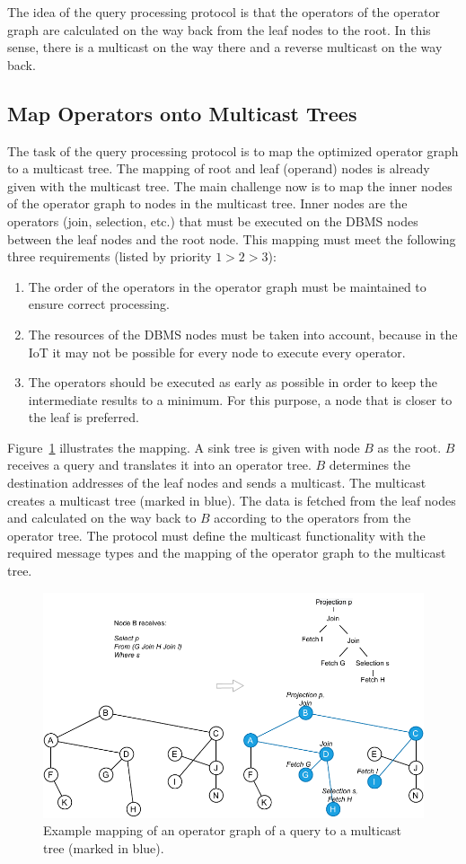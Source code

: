 \documentclass[english,version-2019-11]{uzl-thesis}
\begin{document}
The idea of the query processing protocol is that the operators of the operator graph are calculated on the way back from the leaf nodes to the root. In this sense, there is a multicast on the way there and a reverse multicast on the way back.

\subsection{Map Operators onto Multicast Trees}
The task of the query processing protocol is to map the optimized operator graph to a multicast tree. The mapping of root and leaf (operand) nodes is already given with the multicast tree. The main challenge now is to map the inner nodes of the operator graph to nodes in the multicast tree. Inner nodes are the operators (join, selection, etc.) that must be executed on the DBMS nodes between the leaf nodes and the root node. This mapping must meet the following three requirements (listed by priority $1 > 2 > 3$):
\begin{enumerate}
 \item The order of the operators in the operator graph must be maintained to ensure correct processing.
 \item The resources of the DBMS nodes must be taken into account, because in the IoT it may not be possible for every node to execute every operator.
 \item The operators should be executed as early as possible in order to keep the intermediate results to a minimum. For this purpose, a node that is closer to the leaf is preferred.
\end{enumerate}
Figure~\ref{figure_multicast_tree} illustrates the mapping. A sink tree is given with node $B$ as the root. $B$ receives a query and translates it into an operator tree. $B$ determines the destination addresses of the leaf nodes and sends a multicast. The multicast creates a multicast tree (marked in blue). The data is fetched from the leaf nodes and calculated on the way back to $B$ according to the operators from the operator tree. The protocol must define the multicast functionality with the required message types and the mapping of the operator graph to the multicast tree.
\begin{figure}[htpb]
  \centering
  \includegraphics{figure_multicast_tree.pdf}
  \caption{Example mapping of an operator graph of a query to a multicast tree (marked in blue).}
  \label{figure_multicast_tree}
\end{figure}
\end{document}
